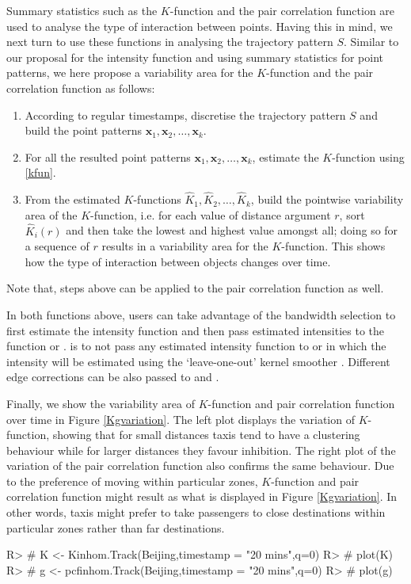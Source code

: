 \documentclass[article]{jss}
\begin{document}
Summary statistics such as the $K$-function and the pair correlation function are used to analyse the type of interaction between points. Having this in mind, we next turn to use these functions in analysing the trajectory pattern $S$. Similar to our proposal for the intensity function and using summary statistics for point patterns, we here propose a variability area for the $K$-function and the pair correlation function as follows:
  \begin{leftbar}
  \begin{enumerate}
  \item According to regular timestamps, discretise the trajectory pattern $S$ and build the point patterns $\textbf{x}_1,\textbf{x}_2, \ldots, \textbf{x}_k$.
  \item For all the resulted point patterns $\textbf{x}_1,\textbf{x}_2, \ldots, \textbf{x}_k$, estimate the $K$-function using \eqref{kfun}.
  \item From the estimated $K$-functions $\widehat{K}_1, \widehat{K}_2,\ldots,\widehat{K}_k$, build the pointwise variability area of the $K$-function, i.e. for each value of distance argument $r$, sort $\widehat{K}_i(r)$ and then take the lowest and highest value amongst all; doing so for a sequence of $r$ results in a variability area for the $K$-function. This shows how the type of interaction between objects changes over time.
  \end{enumerate}
  \end{leftbar}

Note that, steps above can be applied to the pair correlation function as well.

In both functions above, users can take advantage of the bandwidth selection to first estimate the intensity function and then pass estimated intensities to the function  or .  is to not pass any estimated intensity function to  or  in which the intensity will be estimated using the `leave-one-out' kernel smoother \citep{baddeley00,BRT15}. Different edge corrections can be also passed to  and . 
  
  
  Finally, we show the variability area of $K$-function and pair correlation function over time in Figure \ref{Kgvariation}. The left plot displays the variation of $K$-function, showing that for small distances taxis tend to have a clustering behaviour while for larger distances they favour inhibition. The right plot of the variation of the pair correlation function also confirms the same behaviour. Due to the preference of moving within particular zones, $K$-function and pair correlation function might result as what is displayed in Figure \ref{Kgvariation}. In other words, taxis might prefer to take passengers to close destinations within particular zones rather than far destinations. 
\begin{Schunk}
\begin{Sinput}
R>  # K <- Kinhom.Track(Beijing,timestamp = "20 mins",q=0)
R>  # plot(K)
R>  # g <- pcfinhom.Track(Beijing,timestamp = "20 mins",q=0)
R>  # plot(g)
\end{Sinput}
\end{Schunk}
  
\end{document}
